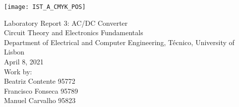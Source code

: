 
\thispagestyle {empty}

\texttt{[image: IST\_A\_CMYK\_POS]}

\begin{center}
%
\vspace{1.0cm}

\vspace{1cm}
{\FontLb Laboratory Report 3: AC/DC Converter} \\ %
\vspace{1cm}
{\FontSn Circuit Theory and Electronics Fundamentals} \\
\vspace{1cm}
{\FontSn Department of Electrical and Computer Engineering, Técnico, University of Lisbon} \\ %
\vspace{1cm}
{\FontSn April 8, 2021} \\ %
\vspace{1cm}
{\FontSn Work by:} \\ 
\vspace{0.5cm}
{\FontSn Beatriz Contente 95772} \\ 
\vspace{0.5cm}
{\FontSn Francisco Fonseca 95789} \\ 
\vspace{0.5cm}
{\FontSn Manuel Carvalho 95823} \\ 
%
\end{center}
